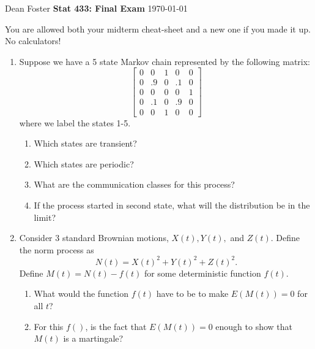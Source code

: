 \documentclass[12pt]{article}
\begin{document}
Dean Foster \hfill {\bf Stat 433: Final Exam} \hfill\today
\vspace{1em}

You are allowed both your midterm cheat-sheet and a new one if you made
it up.  No calculators!

\begin{enumerate}


\item Suppose we have a 5 state Markov chain represented by the
following matrix: 
\begin{displaymath}
\left[\begin{array}{ccccc}
        0 & 0 & 1 & 0 & 0 \\
        0 & .9& 0 & .1& 0 \\
        0 & 0 & 0 & 0 & 1 \\
        0 & .1& 0 & .9& 0 \\
        0 & 0 & 1 & 0 & 0
\end{array}
\right]
\end{displaymath}
where we label the states 1-5.
\begin{enumerate}
\item Which states are transient?
\item Which states are periodic?
\item What are the communication classes for this process?
\item If the process started in second state, what will the
distribution be in the limit?
\end{enumerate}


\item Consider 3 standard Brownian motions, $X(t), Y(t),$ and $Z(t)$.
Define the norm process as
\begin{displaymath}
N(t) = X(t)^2 + Y(t)^2 + Z(t)^2.
\end{displaymath}
Define $M(t) = N(t) - f(t)$ for some deterministic function $f(t)$. 
\begin{enumerate}
\item What would the function $f(t)$ have to be to make $E(M(t)) = 0$
for all $t$? 
\item For this $f()$, is the fact that  $E(M(t)) = 0$ enough to show
that $M(t)$ is a martingale?
\end{enumerate}


\end{enumerate}
\end{document}
